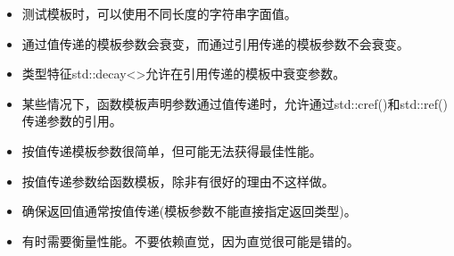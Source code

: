 
\begin{itemize}
\item 
测试模板时，可以使用不同长度的字符串字面值。

\item 
通过值传递的模板参数会衰变，而通过引用传递的模板参数不会衰变。

\item 
类型特征std::decay<>允许在引用传递的模板中衰变参数。

\item 
某些情况下，函数模板声明参数通过值传递时，允许通过std::cref()和std::ref()传递参数的引用。

\item 
按值传递模板参数很简单，但可能无法获得最佳性能。

\item 
按值传递参数给函数模板，除非有很好的理由不这样做。

\item 
确保返回值通常按值传递(模板参数不能直接指定返回类型)。

\item 
有时需要衡量性能。不要依赖直觉，因为直觉很可能是错的。
\end{itemize}